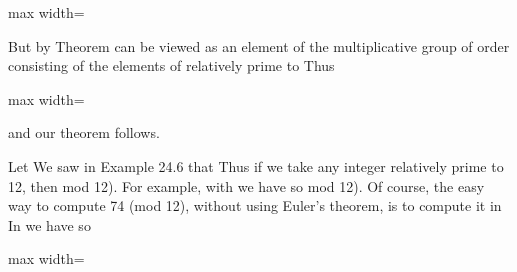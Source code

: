 \documentclass[11pt,oneside]{article}
\begin{document}
\begin{BookBody}
\begin{center}\begin{adjustbox}{max width=\linewidth}\end{adjustbox}\end{center}

\noindent But by Theorem  can be viewed as an element of the multiplicative group  of order  consisting of the  elements of  relatively prime to  Thus

\begin{center}\begin{adjustbox}{max width=\linewidth}\end{adjustbox}\end{center}

\noindent and our theorem follows. \BookEnd{\blacklozenge}

 Let  We saw in Example 24.6 that  Thus if we take any integer  relatively prime to 12, then mod 12). For example, with  we have   so mod 12). Of course, the easy way to compute 74 (mod 12), without using Euler’s theorem, is to compute it in  In  we have  so

\begin{center}\begin{adjustbox}{max width=\linewidth}\end{adjustbox}\end{center} \BookEnd{\blacktriangle}

\end{BookBody}

\BookNarrativetrue
\end{document}

